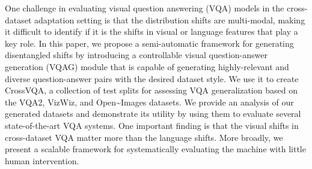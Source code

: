 One challenge in evaluating visual question answering (VQA) models in the cross-dataset adaptation setting is that the distribution shifts are multi-modal, making it difficult to identify if it is the shifts in visual or language features that play a key role. In this paper, we propose a semi-automatic framework for generating disentangled shifts by introducing a controllable visual question-answer generation (VQAG) module that is capable of generating highly-relevant and diverse question-answer pairs with the desired dataset style. We use it to create CrossVQA, a collection of test splits for assessing VQA generalization based on the VQA2, VizWiz, and Open{\textasciitilde}Images datasets. We provide an analysis of our generated datasets and demonstrate its utility by using them to evaluate several state-of-the-art VQA systems. One important finding is that the visual shifts in cross-dataset VQA matter more than the language shifts. More broadly, we present a scalable framework for systematically evaluating the machine with little human intervention.

